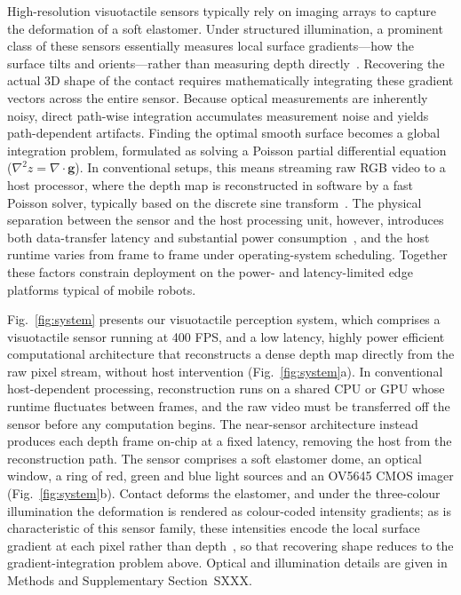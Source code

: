 \documentclass[10pt,a4paper]{article}
\begin{document}
High-resolution visuotactile sensors typically rely on imaging arrays to capture the deformation of a soft elastomer. Under structured illumination, a prominent class of these sensors essentially measures local surface gradients—how the surface tilts and orients—rather than measuring depth directly~\cite{yuan2017gelsight}. 
Recovering the actual 3D shape of the contact requires mathematically integrating these gradient vectors across the entire sensor. 
Because optical measurements are inherently noisy, direct path-wise integration accumulates measurement noise and yields path-dependent artifacts. Finding the optimal smooth surface becomes a global integration problem, formulated as solving a Poisson partial differential equation ($\nabla^2 z = \nabla \cdot \mathbf{g}$). 
In conventional setups, this means streaming raw RGB video to a host processor, where the depth map is reconstructed in software by a fast Poisson solver, typically based on the discrete sine transform~\cite{yuan2017gelsight,wang2021gelsightwedge}.
The physical separation between the sensor and the host processing unit, however, introduces both data-transfer latency and substantial power consumption~\cite{chen2025capacitive}, and the host runtime varies from frame to frame under operating-system scheduling. Together these factors constrain deployment on the power- and latency-limited edge platforms typical of mobile robots.


Fig.~\ref{fig:system} presents our visuotactile perception system, which comprises a visuotactile sensor running at 400 FPS, and a low latency, highly power efficient computational architecture that reconstructs a dense depth map directly from the raw pixel stream, without host intervention (Fig.~\ref{fig:system}a). 
In conventional host-dependent processing, reconstruction runs on a shared CPU or GPU whose runtime fluctuates between frames, and the raw video must be transferred off the sensor before any computation begins. The near-sensor architecture instead produces each depth frame on-chip at a fixed latency, removing the host from the reconstruction path.
The sensor comprises a soft elastomer dome, an optical window, a ring of red, green and blue light sources and an OV5645 CMOS imager (Fig.~\ref{fig:system}b). Contact deforms the elastomer, and under the three-colour illumination the deformation is rendered as colour-coded intensity gradients; as is characteristic of this sensor family, these intensities encode the local surface gradient at each pixel rather than depth~\cite{yuan2017gelsight}, so that recovering shape reduces to the gradient-integration problem above. Optical and illumination details are given in Methods and Supplementary Section~SXXX.
\end{document}
